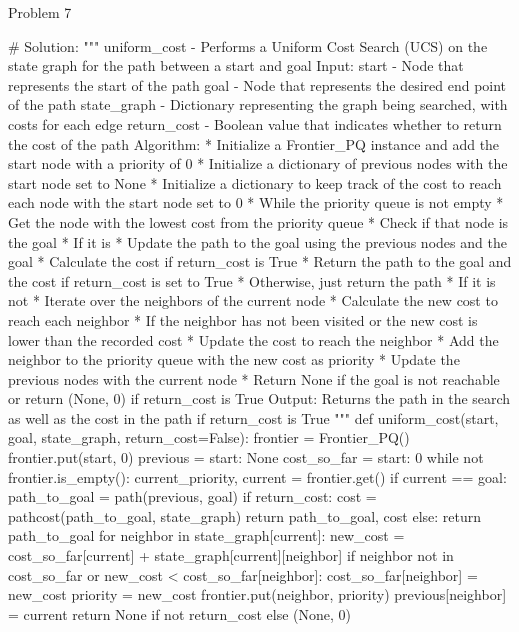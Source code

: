 \begin{problem}{Problem 7}
\begin{highlight}[Solution]
\begin{code}[Python]
    # Solution:
    """ uniform_cost - Performs a Uniform Cost Search (UCS) on the state graph for the path between a start and goal
        Input:
            start - Node that represents the start of the path
            goal - Node that represents the desired end point of the path
            state_graph - Dictionary representing the graph being searched, with costs for each edge
            return_cost - Boolean value that indicates whether to return the cost of the path
        Algorithm:
            * Initialize a Frontier_PQ instance and add the start node with a priority of 0
            * Initialize a dictionary of previous nodes with the start node set to None
            * Initialize a dictionary to keep track of the cost to reach each node with the start node set to 0
            * While the priority queue is not empty
                * Get the node with the lowest cost from the priority queue
                * Check if that node is the goal
                * If it is
                    * Update the path to the goal using the previous nodes and the goal
                    * Calculate the cost if return_cost is True
                    * Return the path to the goal and the cost if return_cost is set to True
                    * Otherwise, just return the path
                * If it is not
                    * Iterate over the neighbors of the current node
                    * Calculate the new cost to reach each neighbor
                    * If the neighbor has not been visited or the new cost is lower than the recorded cost
                        * Update the cost to reach the neighbor
                        * Add the neighbor to the priority queue with the new cost as priority
                        * Update the previous nodes with the current node
            * Return None if the goal is not reachable or return (None, 0) if return_cost is True
        Output:
            Returns the path in the search as well as the cost in the path if return_cost is True
    """
    def uniform_cost(start, goal, state_graph, return_cost=False):
        frontier = Frontier_PQ()
        frontier.put(start, 0)
        previous = {start: None}
        cost_so_far = {start: 0}
        while not frontier.is_empty():
            current_priority, current = frontier.get()
            if current == goal:
                path_to_goal = path(previous, goal)
                if return_cost:
                    cost = pathcost(path_to_goal, state_graph)
                    return path_to_goal, cost
                else:
                    return path_to_goal
            for neighbor in state_graph[current]:
                new_cost = cost_so_far[current] + state_graph[current][neighbor]
                if neighbor not in cost_so_far or new_cost < cost_so_far[neighbor]:
                    cost_so_far[neighbor] = new_cost
                    priority = new_cost
                    frontier.put(neighbor, priority)
                    previous[neighbor] = current
        return None if not return_cost else (None, 0)
    \end{code}
    \end{highlight}
\end{problem}

